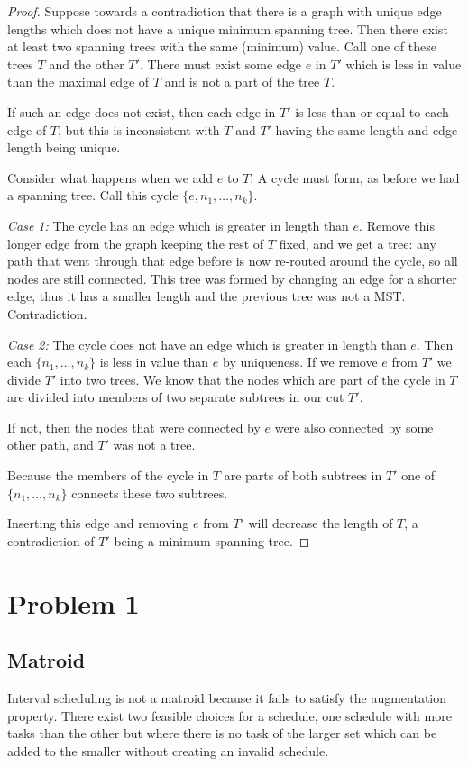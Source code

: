 \documentclass{article}
\begin{document}
\begin{proof}
Suppose towards a contradiction that there is a graph with unique edge lengths which does not have a unique minimum spanning tree. Then there exist at least two spanning trees with the same (minimum) value. Call one of these trees $T$ and the other $T'$. There must exist some edge $e$ in $T'$ which is less in value than the maximal edge of $T$ and is not a part of the tree $T$.

If such an edge does not exist, then each edge in $T'$ is less than or equal to each edge of  $T$, but this is inconsistent with $T$ and $T'$ having the same length and edge length being unique.

Consider what happens when we add $e$ to $T$. A cycle must form, as before we had a spanning tree. Call this cycle $\{e,n_1,\dots,n_k\}$.

\emph{Case 1:} The cycle has an edge which is greater in length than $e$. Remove this longer edge from the graph keeping the rest of $T$ fixed, and we get a tree: any path that went through that edge before is now re-routed around the cycle, so all nodes are still connected.  This tree was formed by changing an edge for a shorter edge, thus it has a smaller length and the previous tree was not a MST. Contradiction.

\emph{Case 2:} The cycle does not have an edge which is greater in length than $e$. Then each $\{n_1,\dots,n_k\}$ is less in value than $e$ by uniqueness. If we remove $e$ from $T'$ we divide $T'$ into two trees. We know that the nodes which are part of the cycle in $T$ are divided into members of two separate subtrees in our cut $T'$.

If not, then the nodes that were connected by $e$ were also connected by some other path, and $T'$ was not a tree.

Because the members of the cycle in $T$ are parts of both subtrees in $T'$ one of $\{n_1,\dots,n_k\}$ connects these two subtrees.

Inserting this edge and removing $e$ from $T'$  will decrease the length of $T$, a contradiction of $T'$ being a minimum spanning tree.\end{proof}

\section{Problem 1}
\subsection{Matroid}
Interval scheduling is not a matroid because it fails to satisfy the augmentation property. There exist two feasible choices for a schedule, one schedule with more tasks than the other but where there is no task of the larger set which can be added to the smaller without creating an invalid schedule.
\end{document}
